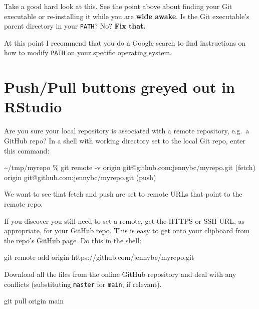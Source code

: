 \documentclass[
]{book}
\newenvironment{Shaded}{\begin{snugshade}}{\end{snugshade}}
\newcommand{\NormalTok}[1]{#1}
\begin{document}
Take a good hard look at this.
See the point above about finding your Git executable or re-installing it while you are \textbf{wide awake}.
Is the Git executable's parent directory in your \texttt{PATH}?
No?
\textbf{Fix that.}

At this point I recommend that you do a Google search to find instructions on how to modify \texttt{PATH} on your specific operating system.

\section{Push/Pull buttons greyed out in RStudio}\label{pushpull-buttons-greyed-out-in-rstudio}

Are you sure your local repository is associated with a remote repository, e.g.~a GitHub repo?
In a shell with working directory set to the local Git repo, enter this command:

\begin{Shaded}
\begin{Highlighting}[]
\NormalTok{\textasciitilde{}/tmp/myrepo \% git remote {-}v                                           }
\NormalTok{origin  git@github.com:jennybc/myrepo.git (fetch)}
\NormalTok{origin  git@github.com:jennybc/myrepo.git (push)}
\end{Highlighting}
\end{Shaded}

We want to see that fetch and push are set to remote URLs that point to the remote repo.

If you discover you still need to set a remote, get the HTTPS or SSH URL, as appropriate, for your GitHub repo.
This is easy to get onto your clipboard from the repo's GitHub page.
Do this in the shell:

\begin{Shaded}
\begin{Highlighting}[]
\NormalTok{git remote add origin https://github.com/jennybc/myrepo.git}
\end{Highlighting}
\end{Shaded}

Download all the files from the online GitHub repository and deal with any
conflicts (substituting \texttt{master} for \texttt{main}, if relevant).

\begin{Shaded}
\begin{Highlighting}[]
\NormalTok{git pull origin main}
\end{Highlighting}
\end{Shaded}
\end{document}
